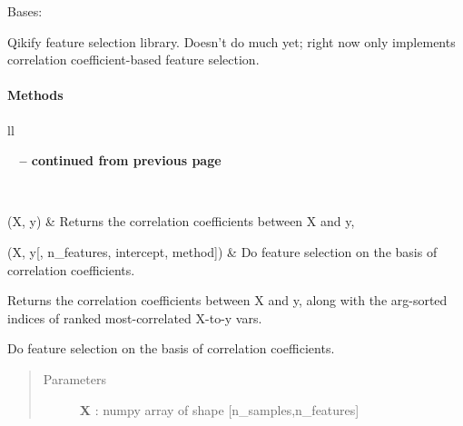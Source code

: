 \documentclass[letterpaper,10pt,english]{sphinxmanual}
\begin{document}
\begin{fulllineitems}
\label{qikify.controllers:qikify.controllers.QFFS.QFFS}
Bases: 

Qikify feature selection library. Doesn't do much yet; right now only implements
correlation coefficient-based feature selection.
\paragraph{Methods}

\begin{longtable}{ll}
\hline
\endfirsthead

%
{{\bfseries \tablename\ \thetable{} -- continued from previous page}} \\
\hline
\endhead

\hline {} \\ \hline
\endfoot

\hline
\endlastfoot


{\hyperref[qikify.controllers:qikify.controllers.QFFS.QFFS.computeCorrCoefs]{}}(X, y)
 & 
Returns the correlation coefficients between X and y,
\\\hline

{\hyperref[qikify.controllers:qikify.controllers.QFFS.QFFS.run]{}}(X, y{[}, n\_features, intercept, method{]})
 & 
Do feature selection on the basis of correlation coefficients.
\\\hline
\end{longtable}


\begin{fulllineitems}
\label{qikify.controllers:qikify.controllers.QFFS.QFFS.computeCorrCoefs}
Returns the correlation coefficients between X and y, 
along with the arg-sorted indices of ranked most-correlated X-to-y vars.

\end{fulllineitems}


\begin{fulllineitems}
\label{qikify.controllers:qikify.controllers.QFFS.QFFS.run}
Do feature selection on the basis of correlation coefficients.
\begin{quote}\begin{description}
\item[{Parameters }] \leavevmode
\textbf{X} : numpy array of shape {[}n\_samples,n\_features{]}
\begin{quote}


\end{quote}
\end{description}
\end{quote}
\end{fulllineitems}
\end{fulllineitems}
\end{document}
